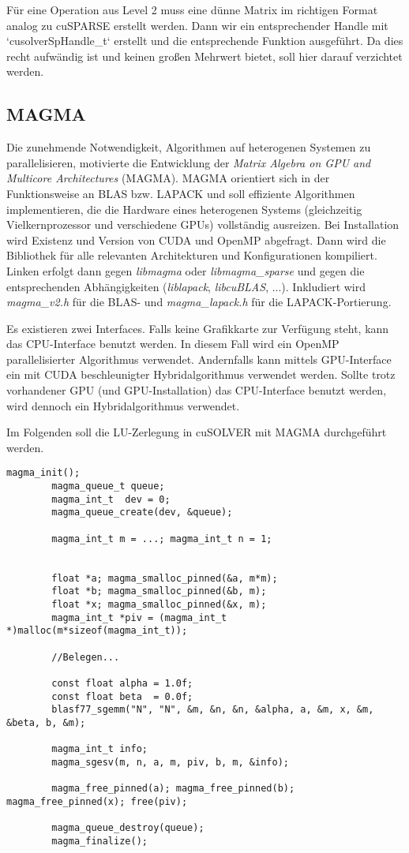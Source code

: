 		Für eine Operation aus Level 2 muss eine dünne Matrix im richtigen Format analog zu cuSPARSE erstellt werden. Dann wir ein entsprechender \Gls{Handle} mit \li`cusolverSpHandle_t` erstellt und die entsprechende Funktion ausgeführt. Da dies recht aufwändig ist und keinen großen Mehrwert bietet, soll hier darauf verzichtet werden.
		
		\subsection{MAGMA}
		Die zunehmende Notwendigkeit, Algorithmen auf heterogenen Systemen zu parallelisieren, motivierte die Entwicklung der \textit{Matrix Algebra on GPU and Multicore Architectures} (MAGMA). MAGMA orientiert sich in der Funktionsweise an BLAS bzw. LAPACK und soll effiziente Algorithmen implementieren, die die Hardware eines heterogenen Systems (gleichzeitig Vielkernprozessor und verschiedene GPUs) vollständig ausreizen. Bei Installation wird Existenz und Version von CUDA und OpenMP abgefragt. Dann wird die Bibliothek für alle relevanten Architekturen und Konfigurationen kompiliert. Linken erfolgt dann gegen \textit{libmagma} oder \textit{libmagma{\_}sparse} und gegen die entsprechenden Abhängigkeiten (\textit{liblapack}, \textit{libcuBLAS}, ...). Inkludiert wird \textit{magma{\_}v2.h} für die BLAS- und \textit{magma{\_}lapack.h} für die LAPACK-Portierung.

		Es existieren zwei Interfaces. Falls keine Grafikkarte zur Verfügung steht, kann das CPU-Interface benutzt werden. In diesem Fall wird ein OpenMP parallelisierter Algorithmus verwendet. Andernfalls kann mittels GPU-Interface ein mit CUDA beschleunigter Hybridalgorithmus verwendet werden. Sollte trotz vorhandener GPU (und GPU-Installation) das CPU-Interface benutzt werden, wird dennoch ein Hybridalgorithmus verwendet.
		
		Im Folgenden soll die LU-Zerlegung in cuSOLVER mit MAGMA durchgeführt werden.
		
		\begin{lstlisting}[caption=MAGMA: CPU-Interface]
		magma_init();
		magma_queue_t queue;
		magma_int_t  dev = 0;
		magma_queue_create(dev, &queue);
  
		magma_int_t m = ...; magma_int_t n = 1;
                      
                      
		float *a; magma_smalloc_pinned(&a, m*m);   
		float *b; magma_smalloc_pinned(&b, m);  
		float *x; magma_smalloc_pinned(&x, m);   
		magma_int_t *piv = (magma_int_t *)malloc(m*sizeof(magma_int_t));
		
		//Belegen...

		const float alpha = 1.0f;
		const float beta  = 0.0f;
		blasf77_sgemm("N", "N", &m, &n, &n, &alpha, a, &m, x, &m, &beta, b, &m);

		magma_int_t info;
		magma_sgesv(m, n, a, m, piv, b, m, &info);

		magma_free_pinned(a); magma_free_pinned(b); magma_free_pinned(x); free(piv);

		magma_queue_destroy(queue);
		magma_finalize();
		\end{lstlisting}
		
